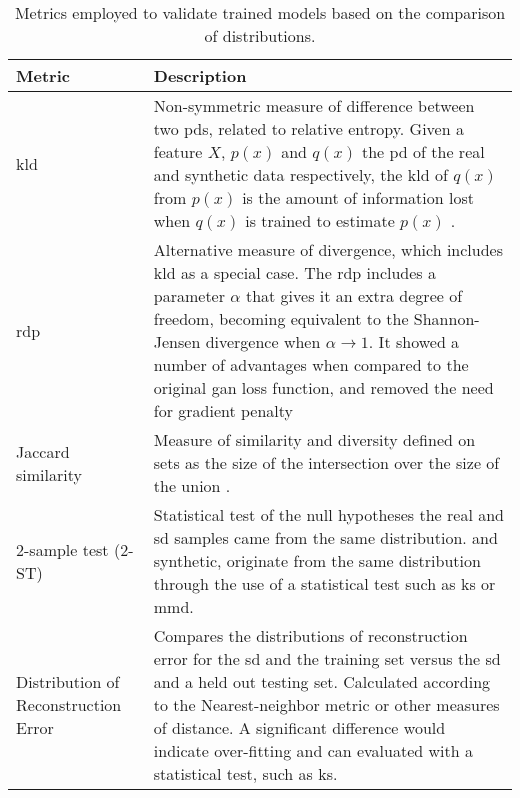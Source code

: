  \begin{table}[H]         
 \footnotesize  
 \setlength{\extrarowheight}{0.5em}
 \caption{Metrics employed to validate trained models based on the comparison of distributions.\label{tab:3:distributions}}              
    \begin{tabular}{@{} p{} p{} @{}}\toprule                          
    Metric & Description \\ \midrule                                  
    
    \gls{kld} 
    & Non-symmetric measure of difference between two \glspl{pd}, related to relative entropy. Given a feature $X$, $p(x)$ and $q(x)$ the \gls{pd} of the real and synthetic data respectively, the \gls{kld} of $q(x)$ from $p(x)$ is the amount of information lost when $q(x)$ is trained to estimate $p(x)$ \cite{klb2008, Goncalves2020}. \\       
    
    \gls{rdp} 
    & Alternative measure of divergence, which includes \gls{kld} as a special case. The \gls{rdp} includes a parameter $\alpha$ that gives it an extra degree of freedom, becoming equivalent to the Shannon-Jensen divergence when $\alpha \longrightarrow 1$. It showed a number of advantages when compared to the original \gls{gan} loss function, and removed the need for gradient penalty \cite{VanBalveren2018, tanti2019}\\ 
    
    Jaccard similarity & Measure of similarity and diversity defined on sets as the size of the intersection over the size of the union \cite{ozyigit2020generation, Yang_2019_ehr, Wikipediacontributors}.\\

    2-sample test (2-ST) 
    & Statistical test of the null hypotheses the real and \gls{sd} samples came from the same distribution. and synthetic, originate from the same distribution through the use of a statistical test such as \gls{ks} or \gls{mmd}.\cite{Fisher2019,baowaly_2019_IEEE,baowaly_2019_jamia,esteban2017real}\\     
    
    Distribution of Reconstruction Error 
    & Compares the distributions of reconstruction error for the \gls{sd} and the training set versus the \gls{sd} and a held out testing set. Calculated according to the Nearest-neighbor metric or other measures of distance. A significant difference would indicate over-fitting and can evaluated with a statistical test, such as \gls{ks}. \cite{esteban2017real}\\
    

\end{tabular}
\end{table}
